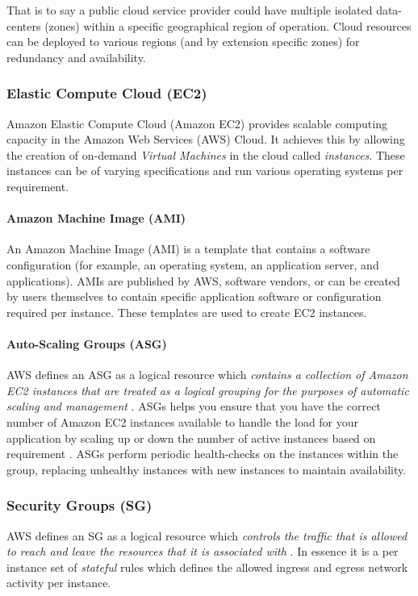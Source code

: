 That is to say a public cloud service provider could have multiple isolated data-centers (zones) within a specific geographical region of operation.
Cloud resources can be deployed to various regions (and by extension specific zones) for redundancy and availability.

\subsubsection{Elastic Compute Cloud (EC2)}
Amazon Elastic Compute Cloud (Amazon EC2) provides scalable computing capacity in the Amazon Web Services (AWS) Cloud\cite{awsdocs_whatsisec2}.
It achieves this by allowing the creation of on-demand \emph{Virtual Machines} in the cloud called \emph{instances}\cite{carty_2019}. 
These instances can be of varying specifications \cite{daly_2022} and run various operating systems \cite{awsdocs_ec2os} per requirement.

\paragraph{Amazon Machine Image (AMI)}
An Amazon Machine Image (AMI) is a template that contains a software configuration (for example, an operating system, an application server, and applications)\cite{awsdocs_ami}.
AMIs are published by AWS, software vendors, or can be created by users themselves to contain specific application software or configuration required per instance.
These templates are used to create EC2 instances\cite{Beach2014}. 

\paragraph{Auto-Scaling Groups (ASG)}
AWS defines an ASG as a logical resource which \emph{contains a collection of Amazon EC2 instances that are treated as a logical grouping for the purposes of automatic scaling and management} \cite{awsdocs_asg}.
ASGs helps you ensure that you have the correct number of Amazon EC2 instances available to handle the load for your application by scaling up or down the number of active instances based on requirement \cite{amazon_asg_docs}. 
ASGs perform periodic health-checks on the instances within the group, replacing unhealthy instances with new instances to maintain availability.

\subsubsection{Security Groups (SG)}
AWS defines an SG as a logical resource which \emph{controls the traffic that is allowed to reach and leave the resources that it is associated with} \cite{amazon_2016}.
In essence it is a per instance set of \emph{stateful} rules which defines the allowed ingress and egress network activity per instance. 

